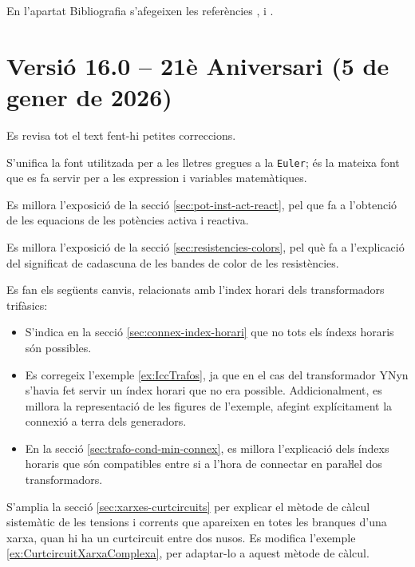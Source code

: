 En l'apartat Bibliografia s'afegeixen les referències \cite{KRE}, \cite{SAL}  i \cite{MGIO}.


\section*{Versió 16.0 -- 21è Aniversari (5 de gener de 2026)}

Es revisa tot el text fent-hi petites correccions.

S'unifica la font utilitzada per a les lletres gregues a la \texttt{Euler}; és la mateixa font que es fa servir per a les expression i variables matemàtiques.

Es millora l'exposició de la secció \ref{sec:pot-inst-act-react}, pel que fa a  l'obtenció de les equacions de les potències activa i reactiva.

Es millora l'exposició de la secció \ref{sec:resistencies-colors}, pel què fa a l'explicació del significat de cadascuna de les bandes de color de les resistències.

Es fan els següents canvis, relacionats amb l'index horari dels transformadors trifàsics:
\begin{itemize}
    \item S'indica en la secció \ref{sec:connex-index-horari} que no  tots els índexs horaris són possibles.
    \item Es corregeix l'exemple \ref{ex:IccTrafos}, ja que en el cas del transformador YNyn s'havia fet servir un índex horari que no era possible. Addicionalment, es millora la representació de les figures de l'exemple, afegint explícitament la connexió a terra dels generadors.
    \item En la secció \ref{sec:trafo-cond-min-connex}, es millora l'explicació  dels índexs horaris que són compatibles entre si a l'hora de connectar en paraŀlel dos transformadors.
\end{itemize}

S'amplia la secció \ref{sec:xarxes-curtcircuits} per explicar el mètode de càlcul sistemàtic de les tensions i corrents que apareixen en totes les branques d'una xarxa, quan hi ha un curtcircuit entre dos nusos.
Es modifica l'exemple \ref{ex:CurtcircuitXarxaComplexa}, per adaptar-lo a aquest mètode de càlcul.

